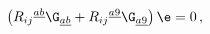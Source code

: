 \begin{equation}
\left( R_{ij}{}^{\underline{ab}}\G_{\underline{ab}} +
R_{ij}{}^{\underline{a9}}\G_{\underline{a9}} \right) \e=0 \,,
\end{equation}

